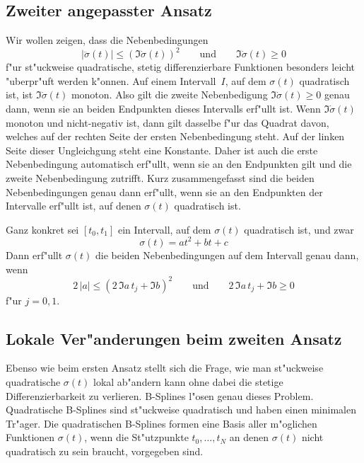 \documentclass[a4paper]{scrartcl}
\begin{document}
\subsection{Zweiter angepasster Ansatz} \label{sec:2ndansatz}

Wir wollen zeigen, dass die Nebenbedingungen 
$$ \lvert\ddot\sigma(t)\rvert \le (\Im\dot\sigma(t))^2 
\qquad \text{und} \qquad
\Im\dot\sigma(t)\ge0 $$
f"ur st"uckweise quadratische, stetig differenzierbare Funktionen besonders leicht "uberpr"uft werden k"onnen. 
Auf einem Intervall~$I$, auf dem $\sigma(t)$ quadratisch ist, ist $\Im\dot\sigma(t)$ monoton. 
Also gilt die zweite Nebenbedigung $\Im\dot\sigma(t)\ge0$ genau dann, wenn sie an beiden Endpunkten dieses Intervalls erf"ullt ist. 
Wenn $\Im\dot\sigma(t)$ monoton und nicht-negativ ist, dann gilt dasselbe f"ur das Quadrat davon, welches auf der rechten Seite der ersten Nebenbedingung steht. 
Auf der linken Seite dieser Ungleichgung steht eine Konstante. 
Daher ist auch die erste Nebenbedingung automatisch erf"ullt, wenn sie an den Endpunkten gilt und die zweite Nebenbedingung zutrifft. 
Kurz zusammengefasst sind die beiden Nebenbedingungen genau dann erf"ullt, wenn sie an den Endpunkten der Intervalle erf"ullt ist, auf denen $\sigma(t)$ quadratisch ist.

Ganz konkret sei $[t_0,t_1]$ ein Intervall, auf dem $\sigma(t)$ quadratisch ist, und zwar
$$ \sigma(t) = at^2 + bt + c $$
Dann erf"ullt $\sigma(t)$ die beiden Nebenbedingungen auf dem Intervall genau dann, wenn 
$$ 2\,\lvert a\rvert \le (2\,\Im a\,t_j + \Im b)^2
\qquad \text{und} \qquad
2\,\Im a\,t_j + \Im b\ge 0 $$
f"ur $j=0,1$. 


\subsection{Lokale Ver"anderungen beim zweiten Ansatz} \label{sec:2ndansatzLocalChanges}

Ebenso wie beim ersten Ansatz stellt sich die Frage, wie man st"uckweise quadratische $\sigma(t)$ lokal ab"andern kann ohne dabei die stetige Differenzierbarkeit zu verlieren. 
B-Splines l"osen genau dieses Problem. 
Quadratische B-Splines sind st"uckweise quadratisch und haben einen minimalen Tr"ager. 
Die quadratischen B-Splines formen eine Basis aller m"oglichen Funktionen $\sigma(t)$, wenn die St"utzpunkte $t_0,\dotsc, t_N$ an denen $\sigma(t)$ nicht quadratisch zu sein braucht, vorgegeben sind. 
\end{document}
